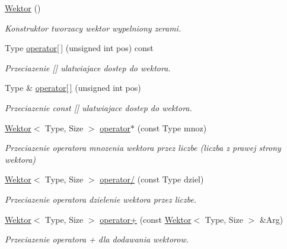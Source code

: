\begin{DoxyCompactItemize}
\item 
\hyperlink{class_wektor_a824a25627a2da1a8d1addc1f9ffd5688}{Wektor} ()
\begin{DoxyCompactList}\small\item\em Konstruktor tworzacy wektor wypelniony zerami. \end{DoxyCompactList}\item 
Type \hyperlink{class_wektor_a82fc83547c00b3ccb3ef82d8dc39cfd1}{operator\mbox{[}$\,$\mbox{]}} (unsigned int pos) const
\begin{DoxyCompactList}\small\item\em Przeciazenie \mbox{[}\mbox{]} ulatwiajace dostep do wektora. \end{DoxyCompactList}\item 
Type \& \hyperlink{class_wektor_af2ba6d2ba38150a5e508e2871e18b80d}{operator\mbox{[}$\,$\mbox{]}} (unsigned int pos)
\begin{DoxyCompactList}\small\item\em Przeciazenie const \mbox{[}\mbox{]} ulatwiajace dostep do wektora. \end{DoxyCompactList}\item 
\hyperlink{class_wektor}{Wektor}$<$ Type, Size $>$ \hyperlink{class_wektor_ac7ea75dec9cca3926713d1fa0d76cd4f}{operator$\ast$} (const Type mnoz)
\begin{DoxyCompactList}\small\item\em Przeciazenie operatora mnozenia wektora przez liczbe (liczba z prawej strony wektora) \end{DoxyCompactList}\item 
\hyperlink{class_wektor}{Wektor}$<$ Type, Size $>$ \hyperlink{class_wektor_a3f2007dcd0270b8fe90e4e15704f34e6}{operator/} (const Type dziel)
\begin{DoxyCompactList}\small\item\em Przeciazenie operatora dzielenie wektora przez liczbe. \end{DoxyCompactList}\item 
\hyperlink{class_wektor}{Wektor}$<$ Type, Size $>$ \hyperlink{class_wektor_acfb2580d5149ebbb138b9a669b98c892}{operator+} (const \hyperlink{class_wektor}{Wektor}$<$ Type, Size $>$ \&Arg)
\begin{DoxyCompactList}\small\item\em Przeciazenie operatora + dla dodawania wektorow. \end{DoxyCompactList}\item 

\end{DoxyCompactItemize}
